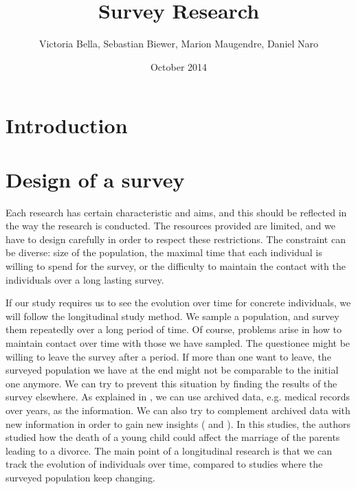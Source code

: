 \documentclass{article}
\title{Survey Research}
\author{Victoria Bella, Sebastian Biewer, Marion Maugendre, Daniel Naro}
\date{October 2014}
\begin{document}
\maketitle

\section{Introduction}
\section{Design of a survey}
Each research has certain characteristic and aims, and this should be reflected in the way the research is conducted. The resources provided are limited, and we have to design carefully in order to respect these restrictions. The constraint can be diverse: size of the population, the maximal time that each individual is willing to spend for the survey, or the difficulty to maintain the contact with the individuals over a long lasting survey.

If our study requires us to see the evolution over time for concrete individuals, we will follow the longitudinal study method. We sample a population, and survey them repeatedly over a long period of time. Of course, problems arise in how to maintain contact over time with those we have sampled. The questionee might be willing to leave the survey after a period. If more than one want to leave, the surveyed population we have at the end might not be comparable to the initial one anymore.
We can try to prevent this situation by finding the results of the survey elsewhere. As explained in \cite{JohnShaughnessyEugeneZechmeister2011}, we can use archived data, e.g. medical records over years, as the information. We can also try to complement archived data with new information in order to gain new insights (\cite{Friedman} and \cite{Tucker}). In this studies, the authors studied how the death of a young child could affect the marriage of the parents leading to a divorce.
The main point of a longitudinal research is that we can track the evolution of individuals over time, compared to studies where the surveyed population keep changing.
\end{document}
